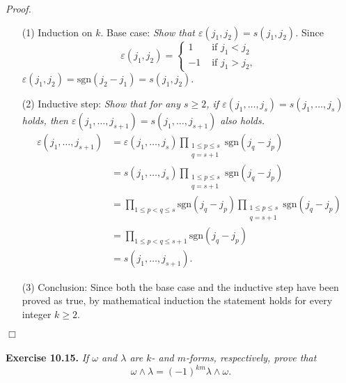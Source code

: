\documentclass{article}
\begin{document}
\emph{Proof.}
\begin{enumerate}
\item[(1)]
  Induction on $k$.
  Base case: \emph{Show that $\varepsilon(j_1,j_2) = s(j_1,j_2)$.}
  Since
  \begin{equation*}
  \varepsilon(j_1,j_2) =
    \begin{cases}
      1
        & \text{ if $j_1 < j_2$} \\
      -1
        & \text{ if $j_1 > j_2$},
    \end{cases}
  \end{equation*}
  $\varepsilon(j_1,j_2) = \mathrm{sgn}(j_2-j_1) = s(j_1,j_2)$.

\item[(2)]
  Inductive step: \emph{Show that for any $s \geq 2$,
  if $\varepsilon(j_1, \ldots, j_{s}) = s(j_1, \ldots, j_{s})$ holds,
  then $\varepsilon(j_1, \ldots, j_{s+1}) = s(j_1, \ldots, j_{s+1})$ also holds.}
  \begin{align*}
    \varepsilon(j_1, \ldots, j_{s+1})
    &= \varepsilon(j_1, \ldots, j_{s})
      \prod_{\substack{1 \leq p \leq s \\ q=s+1}} \mathrm{sgn}(j_q-j_p) \\
    &= s(j_1, \ldots, j_{s})
      \prod_{\substack{1 \leq p \leq s \\ q=s+1}} \mathrm{sgn}(j_q-j_p) \\
    &= \prod_{1 \leq p < q \leq s} \mathrm{sgn}(j_q-j_p)
      \prod_{\substack{1 \leq p \leq s \\ q=s+1}} \mathrm{sgn}(j_q-j_p) \\
    &= \prod_{1 \leq p < q \leq s+1} \mathrm{sgn}(j_q - j_p) \\
    &= s(j_1, \ldots, j_{s+1}).
  \end{align*}

\item[(3)]
  Conclusion: Since both the base case and the inductive step have been proved as true,
  by mathematical induction the statement holds for every integer $k \geq 2$.
\end{enumerate}
$\Box$ \\\\






\textbf{Exercise 10.15.}
\emph{If $\omega$ and $\lambda$ are $k$- and $m$-forms, respectively,
prove that}
\[
  \omega \wedge \lambda = (-1)^{km} \lambda \wedge \omega.
\]
\end{document}
